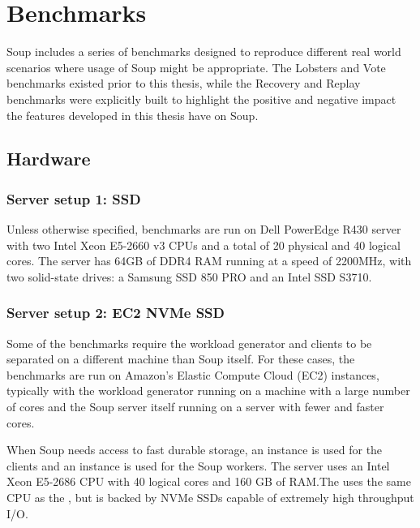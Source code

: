 \chapter{Benchmarks}\label{chap:benchmarks}

Soup includes a series of benchmarks designed to reproduce different real world
scenarios where usage of Soup might be appropriate. The Lobsters and Vote
benchmarks existed prior to this thesis, while the Recovery and Replay
benchmarks were explicitly built to highlight the positive and negative impact
the features developed in this thesis have on Soup.

\newpage

\section{Hardware}


\subsection{Server setup 1: SSD}\label{sec:server-1}

Unless otherwise specified, benchmarks are run on Dell PowerEdge R430 server
with two Intel Xeon E5-2660 v3 CPUs and a total of 20 physical and 40 logical
cores. The server has 64GB of DDR4 RAM running at a speed of 2200MHz, with two
solid-state drives: a Samsung SSD 850 PRO and an Intel SSD S3710.

\subsection{Server setup 2: EC2 NVMe SSD}\label{sec:server-2}

Some of the benchmarks require the workload generator and clients to be
separated on a different machine than Soup itself. For these cases, the
benchmarks are run on Amazon's Elastic Compute Cloud (EC2)
instances, typically with the
workload generator running on a machine with a large number of cores and the
Soup server itself running on a server with fewer and faster cores.

When Soup needs access to fast durable storage, an  instance
is used for the clients and an  instance is used for the Soup
workers. The  server uses an Intel Xeon E5-2686 CPU with 40
logical cores and 160 GB of RAM.\@ The  uses the same CPU as
the , but is backed by NVMe SSDs capable of extremely high throughput
I/O.

